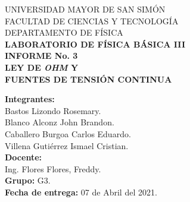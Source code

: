 \documentclass[letter,11pt]{article}
\begin{document}
\begin{titlepage}
\begin{center}
{\Large UNIVERSIDAD MAYOR DE SAN SIMÓN}\\
\vspace*{0.15cm}
{\large FACULTAD DE CIENCIAS Y TECNOLOGÍA}\\
\vspace*{0.10cm}
DEPARTAMENTO DE FÍSICA\\
\vspace*{3.0cm}
{\Large \textbf{LABORATORIO DE FÍSICA BÁSICA III}}\\
\vspace*{0.3cm}
{\Large \textbf{INFORME No. 3}}\\
\vspace*{3.5cm}
{\Large \textbf{LEY DE \emph{OHM} Y \\ FUENTES DE TENSIÓN CONTINUA}}\\
\end{center}

\vspace*{5.8cm}
\leftskip=7.95cm
\noindent
\textbf{Integrantes:}\\
Bastos Lizondo Rosemary.\\
Blanco Alconz John Brandon.\\
Caballero Burgoa Carlos Eduardo.\\
Villena Gutiérrez Ismael Cristian.\\
\newline
\textbf{Docente:}\\
Ing. Flores Flores, Freddy.\\
\newline
\textbf{Grupo:} G3.\\
\textbf{Fecha de entrega:} 07 de Abril del 2021.\\

\end{titlepage}
\end{document}
